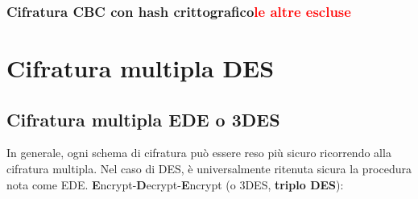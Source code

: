 \subsubsection{Cifratura CBC con hash crittografico\textcolor{red}{le altre escluse}}

\section{Cifratura multipla DES}
\subsection{Cifratura multipla EDE o 3DES}
In generale, ogni schema di cifratura può essere reso più sicuro ricorrendo alla cifratura multipla.
Nel caso di DES, è universalmente ritenuta sicura la procedura nota come EDE.
\textbf{E}ncrypt-\textbf{D}ecrypt-\textbf{E}ncrypt (o 3DES, \textbf{triplo DES}):

